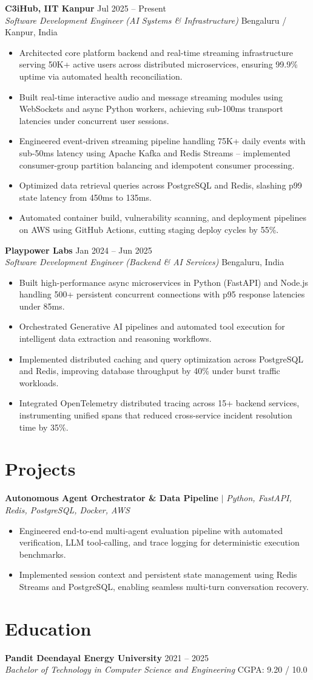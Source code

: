 \documentclass[10pt]{article}
\newcommand{\rItemList}{\begin{itemize}[leftmargin=1.1em, itemsep=1.0pt, topsep=1.0pt, parsep=0pt, label=\textbullet]}
\newcommand{\rEndItemList}{\end{itemize}}
\begin{document}
\textbf{C3iHub, IIT Kanpur} \hfill Jul 2025 -- Present \\
\textit{Software Development Engineer (AI Systems \& Infrastructure)} \hfill Bengaluru / Kanpur, India
\rItemList
\item Architected core platform backend and real-time streaming infrastructure serving 50K+ active users across distributed microservices, ensuring 99.9\% uptime via automated health reconciliation.
\item Built real-time interactive audio and message streaming modules using WebSockets and async Python workers, achieving sub-100ms transport latencies under concurrent user sessions.
\item Engineered event-driven streaming pipeline handling 75K+ daily events with sub-50ms latency using Apache Kafka and Redis Streams -- implemented consumer-group partition balancing and idempotent consumer processing.
\item Optimized data retrieval queries across PostgreSQL and Redis, slashing p99 state latency from 450ms to 135ms.
\item Automated container build, vulnerability scanning, and deployment pipelines on AWS using GitHub Actions, cutting staging deploy cycles by 55\%.
\rEndItemList

\textbf{Playpower Labs} \hfill Jan 2024 -- Jun 2025 \\
\textit{Software Development Engineer (Backend \& AI Services)} \hfill Bengaluru, India
\rItemList
\item Built high-performance async microservices in Python (FastAPI) and Node.js handling 500+ persistent concurrent connections with p95 response latencies under 85ms.
\item Orchestrated Generative AI pipelines and automated tool execution for intelligent data extraction and reasoning workflows.
\item Implemented distributed caching and query optimization across PostgreSQL and Redis, improving database throughput by 40\% under burst traffic workloads.
\item Integrated OpenTelemetry distributed tracing across 15+ backend services, instrumenting unified spans that reduced cross-service incident resolution time by 35\%.
\rEndItemList

\section{Projects}

\textbf{Autonomous Agent Orchestrator \& Data Pipeline} $\vert$ \textit{Python, FastAPI, Redis, PostgreSQL, Docker, AWS} \\
\rItemList
\item Engineered end-to-end multi-agent evaluation pipeline with automated verification, LLM tool-calling, and trace logging for deterministic execution benchmarks.
\item Implemented session context and persistent state management using Redis Streams and PostgreSQL, enabling seamless multi-turn conversation recovery.
\rEndItemList

\section{Education}

\textbf{Pandit Deendayal Energy University} \hfill 2021 -- 2025 \\
\textit{Bachelor of Technology in Computer Science and Engineering} \hfill CGPA: 9.20 / 10.0
\end{document}
